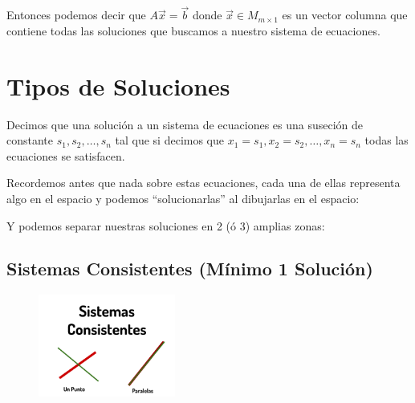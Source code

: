 \documentclass[12pt, fleqn]{report}                             %
\theoremstyle{break}                                            %
\begin{document}
                Entonces podemos decir que $A \vec x = \vec b$ donde $\vec x \in M_{m \times 1}$ es un vector columna
                que contiene todas las soluciones que buscamos a nuestro sistema de ecuaciones.

                


        \clearpage
        \section{Tipos de Soluciones}

            Decimos que una solución a un sistema de ecuaciones es una suseción
            de constante $s_1, s_2, \dots, s_n$ tal que si decimos que 
            $x_1=s_1, x_2=s_2, \dots, x_n=s_n$ todas las ecuaciones se satisfacen.

            Recordemos antes que nada sobre estas ecuaciones, cada una de ellas
            representa algo en el espacio y podemos “solucionarlas” al dibujarlas en
            el espacio:

            Y podemos separar nuestras soluciones en 2 (ó 3) amplias zonas:


            \subsection{Sistemas Consistentes (Mínimo 1 Solución)}

                \begin{figure}
                    \centering
                    \includegraphics[width=0.40\textwidth]{SistemasConsistentes}
                \end{figure}
\end{document}
